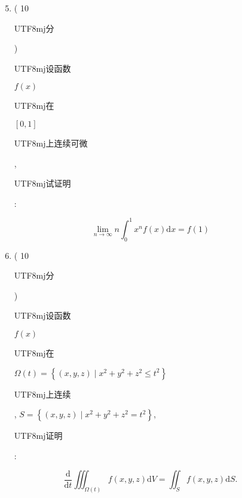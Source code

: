 \documentclass[10pt]{article}
\begin{document}
\begin{enumerate}
  \setcounter{enumi}{4}
  \item ( 10 \begin{CJK}{UTF8}{mj}分\end{CJK}) \begin{CJK}{UTF8}{mj}设函数\end{CJK} $f(x)$ \begin{CJK}{UTF8}{mj}在\end{CJK} $[0,1]$ \begin{CJK}{UTF8}{mj}上连续可微\end{CJK}, \begin{CJK}{UTF8}{mj}试证明\end{CJK}:
\end{enumerate}
$$
\lim _{n \rightarrow \infty} n \int_{0}^{1} x^{n} f(x) \mathrm{d} x=f(1)
$$

\begin{enumerate}
  \setcounter{enumi}{5}
  \item ( 10 \begin{CJK}{UTF8}{mj}分\end{CJK}) \begin{CJK}{UTF8}{mj}设函数\end{CJK} $f(x)$ \begin{CJK}{UTF8}{mj}在\end{CJK} $\Omega(t)=\left\{(x, y, z) \mid x^{2}+y^{2}+z^{2} \leqslant t^{2}\right\}$ \begin{CJK}{UTF8}{mj}上连续\end{CJK}, $S=\left\{(x, y, z) \mid x^{2}+y^{2}+z^{2}=t^{2}\right\}$, \begin{CJK}{UTF8}{mj}证明\end{CJK}:
\end{enumerate}
$$
\frac{\mathrm{d}}{\mathrm{d} t} \iiint_{\Omega(t)} f(x, y, z) \mathrm{d} V=\iint_{S} f(x, y, z) \mathrm{d} S .
$$
\end{document}
